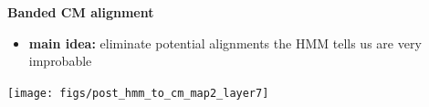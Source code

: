 \documentclass[landscape]{slides}
\begin{document}
\begin{slide}
\begin{center}
\large
\textbf{Banded CM alignment}
\end{center}
\medskip
\small
\begin{itemize}
\item
\textbf{main idea:} eliminate potential alignments the HMM tells us are very improbable
\end{itemize}
\begin{center}
\texttt{[image: figs/post\_hmm\_to\_cm\_map2\_layer7]}
\end{center}
\vfill
\end{slide}
\end{document}
